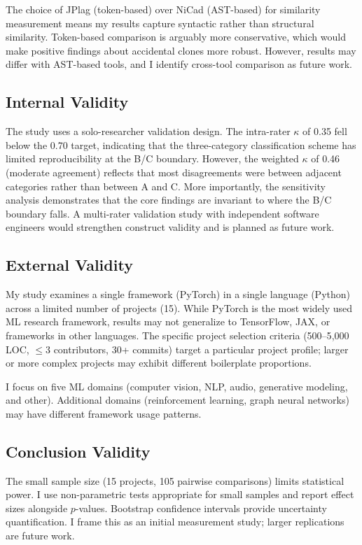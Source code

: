 \documentclass[smallextended,natbib]{svjour3}
\begin{document}
The choice of JPlag (token-based) over NiCad (AST-based) for similarity measurement means my results capture syntactic rather than structural similarity. Token-based comparison is arguably more conservative, which would make positive findings about accidental clones more robust. However, results may differ with AST-based tools, and I identify cross-tool comparison as future work.

\subsection{Internal Validity}

The study uses a solo-researcher validation design. The intra-rater $\kappa$ of 0.35 fell below the 0.70 target, indicating that the three-category classification scheme has limited reproducibility at the B/C boundary. However, the weighted $\kappa$ of 0.46 (moderate agreement) reflects that most disagreements were between adjacent categories rather than between A and C. More importantly, the sensitivity analysis demonstrates that the core findings are invariant to where the B/C boundary falls. A multi-rater validation study with independent software engineers would strengthen construct validity and is planned as future work.

\subsection{External Validity}

My study examines a single framework (PyTorch) in a single language (Python) across a limited number of projects (15). While PyTorch is the most widely used ML research framework, results may not generalize to TensorFlow, JAX, or frameworks in other languages. The specific project selection criteria (500--5{,}000 LOC, $\leq$3 contributors, 30+ commits) target a particular project profile; larger or more complex projects may exhibit different boilerplate proportions.

I focus on five ML domains (computer vision, NLP, audio, generative modeling, and other). Additional domains (reinforcement learning, graph neural networks) may have different framework usage patterns.

\subsection{Conclusion Validity}

The small sample size (15 projects, 105 pairwise comparisons) limits statistical power. I use non-parametric tests appropriate for small samples and report effect sizes alongside $p$-values. Bootstrap confidence intervals provide uncertainty quantification. I frame this as an initial measurement study; larger replications are future work.
\end{document}
